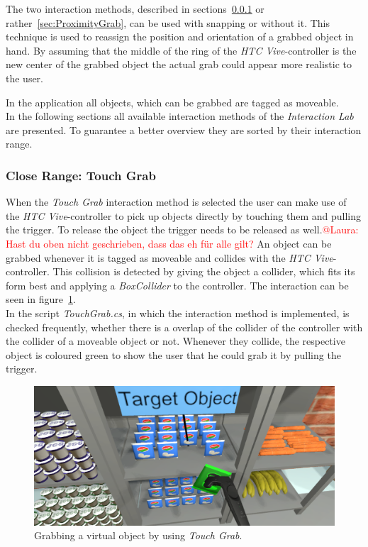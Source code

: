 The two interaction methods, described in sections~\ref{sec:TouchGrab} or rather~\ref{sec:ProximityGrab}, can be used with snapping or without it. This technique is used to reassign the position and orientation of a grabbed object in hand. By assuming that the middle of the ring of the \textit{HTC Vive}-controller is the new center of the grabbed object the actual grab could appear more realistic to the user. 

In the application all objects, which can be grabbed are tagged as moveable.\\

In the following sections all available interaction methods of the \textit{Interaction Lab} are presented. To guarantee a better overview they are sorted by their interaction range. 

\subsubsection{Close Range: Touch Grab} \label{sec:TouchGrab}
When the \textit{Touch Grab} interaction method is selected the user can make use of the \textit{HTC Vive}-controller to pick up objects directly by touching them and pulling the trigger. To release the object the trigger needs to be released as well.\textcolor{red}{@Laura: Hast du oben nicht geschrieben, dass das eh für alle gilt?} An object can be grabbed whenever it is tagged as moveable and collides with the \textit{HTC Vive}-controller. This collision is detected by giving the object a collider, which fits its form best \cite{website:BoxCollider}\cite{website:SphereCollider} and applying a \textit{BoxCollider} to the controller. The interaction can be seen in figure~\ref{fig:touchGrab}. \\
In the script \textit{TouchGrab.cs}, in which the interaction method is implemented, is checked frequently, whether there is a overlap of the collider of the controller with the collider of a moveable object or not. Whenever they collide, the respective object is coloured green to show the user that he could grab it by pulling the trigger. 

\begin{figure}[H] 
	\center 
	\includegraphics[width=12cm]{Images/TouchGrab.PNG}			
	\caption[Grabbing a virtual object by using \textit{Touch Grab}.]{Grabbing a virtual object by using \textit{Touch Grab}.}
	\label{fig:touchGrab}
\end{figure}

